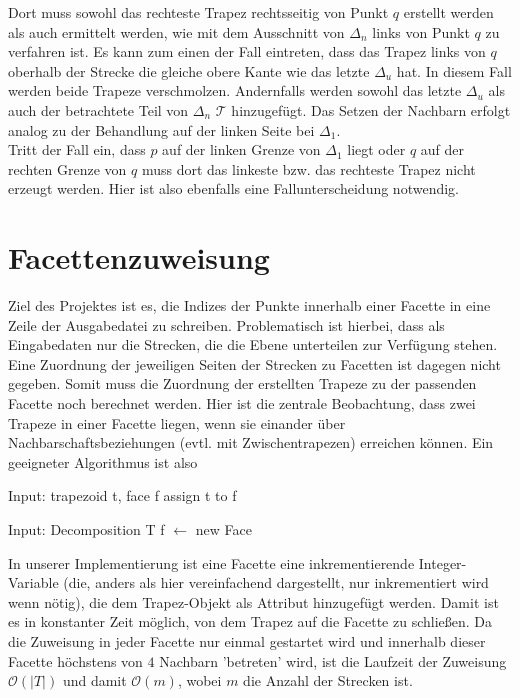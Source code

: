 \documentclass[11pt, a4paper]{article}
\newcommand{\abs}[1]{\left\lvert#1\right\rvert}
\newcommand{\T}{\ensuremath{\mathcal{T}} }
\begin{document}
Dort muss sowohl das rechteste Trapez rechtsseitig von Punkt $q$ erstellt werden als auch ermittelt werden, wie mit dem Ausschnitt von $\Delta_n$ links von Punkt $q$ zu verfahren ist. Es kann zum einen der Fall eintreten, dass das Trapez links von $q$ oberhalb der Strecke die gleiche obere Kante wie das letzte $\Delta_u$ hat. In diesem Fall werden beide Trapeze verschmolzen. Andernfalls werden sowohl das letzte $\Delta_u$ als auch der betrachtete Teil von $\Delta_n$ \T hinzugefügt. Das Setzen der Nachbarn erfolgt analog zu der Behandlung auf der linken Seite bei $\Delta_1$.\\
Tritt der Fall ein, dass $p$ auf der linken Grenze von $\Delta_1$ liegt oder $q$ auf der rechten Grenze von $q$ muss dort das linkeste bzw. das rechteste Trapez nicht erzeugt werden. Hier ist also ebenfalls eine Fallunterscheidung notwendig.

\section{Facettenzuweisung}
Ziel des Projektes ist es, die Indizes der Punkte innerhalb einer Facette in eine Zeile der Ausgabedatei zu schreiben. Problematisch ist hierbei, dass als Eingabedaten nur die Strecken, die die Ebene unterteilen zur Verfügung stehen. Eine Zuordnung der jeweiligen Seiten der Strecken zu Facetten ist dagegen nicht gegeben. Somit muss die Zuordnung der erstellten Trapeze zu der passenden Facette noch berechnet werden. Hier ist die zentrale Beobachtung, dass zwei Trapeze in einer Facette liegen, wenn sie einander über Nachbarschaftsbeziehungen (evtl. mit Zwischentrapezen) erreichen können. Ein geeigneter Algorithmus ist also

\begin{algorithmic}[1]
\State Input: trapezoid t, face f
		\State assign t to f
			\State {}
		\EndFor
	\EndIf
\EndFunction

\State Input: Decomposition T
		\State f $\gets$ new Face
		\State {}
	\EndFor
\EndFunction
\end{algorithmic}

In unserer Implementierung ist eine Facette eine inkrementierende Integer-Variable (die, anders als hier vereinfachend dargestellt, nur inkrementiert wird wenn nötig), die dem Trapez-Objekt als Attribut hinzugefügt werden. Damit ist es in konstanter Zeit möglich, von dem Trapez auf die Facette zu schließen. Da die Zuweisung in jeder Facette nur einmal gestartet wird und innerhalb dieser Facette höchstens von $4$ Nachbarn 'betreten' wird, ist die Laufzeit der Zuweisung $\mathcal{O}(\abs{T})$ und damit $\mathcal{O}(m)$, wobei $m$ die Anzahl der Strecken ist.
\end{document}

